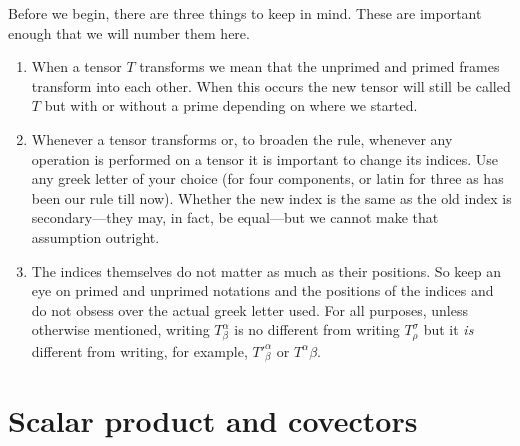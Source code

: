 \documentclass[english,seminar]{lecture}
\begin{document}
Before we begin, there are three things to keep in mind. These are important enough that we will number them here.
\begin{enumerate}
	\item When a tensor $T$ transforms we mean that the unprimed and primed frames transform into each other. When this occurs the new tensor will still be called $T$ but with or without a prime depending on where we started.
	\item Whenever a tensor transforms or, to broaden the rule, whenever any operation is performed on a tensor it is important to change its indices. Use any greek letter of your choice (for four components, or latin for three as has been our rule till now). Whether the new index is the same as the old index is secondary---they may, in fact, be equal---but we cannot make that assumption outright.
	\item The indices themselves do not matter as much as their positions. So keep an eye on primed and unprimed notations and the positions of the indices and do not obsess over the actual greek letter used. For all purposes, unless otherwise mentioned, writing $T^\alpha_\beta$ is no different from writing $T_\rho^\sigma$ but it \textit{is} different from writing, for example, $T'^\alpha_\beta$ or $T^\alpha\beta$.
\end{enumerate}

\section{Scalar product and covectors}
\end{document}
